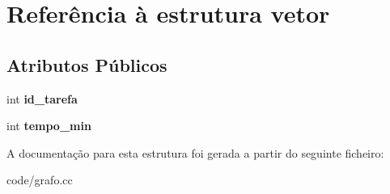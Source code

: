 \hypertarget{structvetor}{\section{Referência à estrutura vetor}
\label{structvetor}
}
\subsection*{Atributos Públicos}
\begin{DoxyCompactItemize}
\item 
\hypertarget{structvetor_ab3b17d0ddfedcab54733c05868851565}{int {\bfseries id\-\_\-tarefa}}\label{structvetor_ab3b17d0ddfedcab54733c05868851565}

\item 
\hypertarget{structvetor_adff1a7b5c98b24c566ae273b5212938e}{int {\bfseries tempo\-\_\-min}}\label{structvetor_adff1a7b5c98b24c566ae273b5212938e}

\end{DoxyCompactItemize}


A documentação para esta estrutura foi gerada a partir do seguinte ficheiro\-:\begin{DoxyCompactItemize}
\item 
code/grafo.\-cc\end{DoxyCompactItemize}
